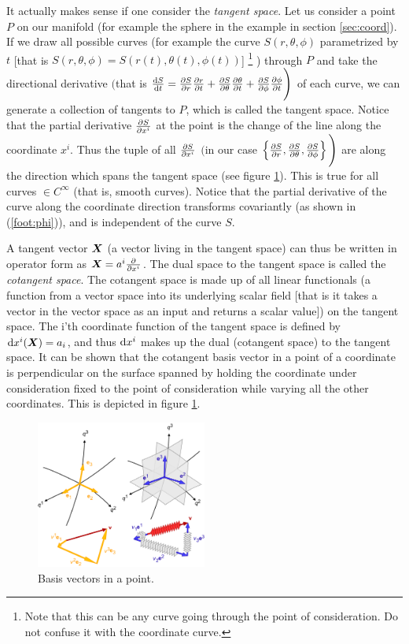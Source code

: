 \documentclass[a4paper, 12pt]{article}
\begin{document}
It actually makes sense if one consider the \emph{tangent space}. Let us 
consider a point $P$ on our manifold (for example the sphere in the example in 
section \ref{sec:coord}). If we draw all possible curves (for example 
the curve $S(r,\theta,\phi)$ parametrized by $t$ [that is 
$S(r,\theta,\phi) = S(r(t),\theta(t),\phi(t))$]%
%
\footnote{\label{note:curve}Note that this can be any curve going through the 
          point of consideration. Do not confuse it with the coordinate curve.}%
%
) through $P$ and take the directional derivative $\Bigg($that is $\frac{\text{d}{S}}{\text{d}{t}} = 
\frac{\partial {S}}{\partial{r}}\frac{\partial {r}}{\partial{t}} + \frac{\partial {S}}{\partial{\theta}}\frac{\partial {\theta}}{\partial{t}} + 
\frac{\partial {S}}{\partial{\phi}}\frac{\partial {\phi}}{\partial{t}}\Bigg)$ of each curve, we can generate a 
collection of tangents to $P$, which is called the tangent space. Notice that 
the partial derivative $\frac{\partial {S}}{\partial{x^i}}$ at the point is the change of the line 
along the coordinate $x^i$. Thus the tuple of all $\frac{\partial {S}}{\partial{x^i}}$ $\Bigg($in 
our case $\left\{\frac{\partial {S}}{\partial{r}}, \frac{\partial {S}}{\partial{\theta}}, \frac{\partial {S}}{\partial{\phi}}\right\} \Bigg)$ are 
along the direction which spans the tangent space (see figure \ref{fig:basis}). 
This is true for all curves $\in C^{\infty}$ (that is, smooth curves). Notice 
that the partial derivative of the curve along the coordinate direction 
transforms covariantly (as shown in (\ref{foot:phi})), and is independent of the 
curve $S$.

A tangent vector $\boldsymbol{X}$ (a vector living in the tangent space) can thus be 
written in operator form as $\boldsymbol{X}=a^i\frac{\partial {}}{\partial{x^{i}}}$. The dual space to 
the tangent space is called the \emph{cotangent space}. The cotangent space is 
made up of all linear functionals (a function from a vector space into its 
underlying scalar field [that is it takes a vector in the vector space as an 
input and returns a scalar value]) on the tangent space. The i'th coordinate 
function of the tangent space is defined by $\text{d} x^i(\boldsymbol{X}) = a_i$, and thus $\text{d} 
x^i$ makes up the dual (cotangent space) to the tangent space. It can be shown 
that the cotangent basis vector in a point of a coordinate is perpendicular on 
the surface spanned by holding the coordinate under consideration fixed to the 
point of consideration while varying all the other coordinates. This is 
depicted 
in figure \ref{fig:basis}.
%
\begin{figure}[h!]
\center
 \includegraphics[width=0.5\textwidth]{figures/co-contra}
 \caption{Basis vectors in a point.}
 \label{fig:basis}
\end{figure}
\end{document}
